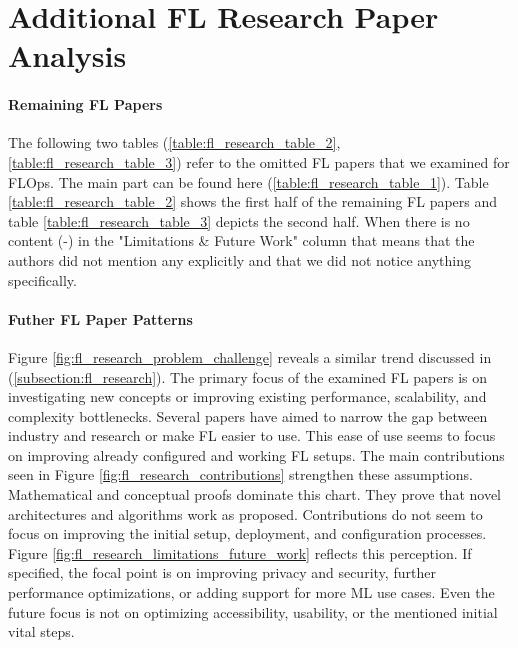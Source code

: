 \appendix
\appendixpage
\addappheadtotoc

\chapter{Additional FL Research Paper Analysis}\label{appendix:fl_research}

\subsubsection{Remaining FL Papers}

The following two tables (\ref{table:fl_research_table_2}, \ref{table:fl_research_table_3}) refer to the omitted FL papers that we examined for FLOps.
The main part can be found here (\ref{table:fl_research_table_1}).
Table \ref{table:fl_research_table_2} shows the first half of the remaining FL papers and
table \ref{table:fl_research_table_3} depicts the second half.
When there is no content (-) in the "Limitations \& Future Work" column that means that the authors did not mention any explicitly and that we did not notice anything specifically.

\begin{figure}[p]
    
\end{figure}

\begin{figure}[p]
    
\end{figure}


\subsubsection{Futher FL Paper Patterns}

Figure \ref{fig:fl_research_problem_challenge} reveals a similar trend discussed in (\ref{subsection:fl_research}).
The primary focus of the examined FL papers is on investigating new concepts or improving existing performance, scalability, and complexity bottlenecks.
Several papers have aimed to narrow the gap between industry and research or make FL easier to use.
This ease of use seems to focus on improving already configured and working FL setups.
The main contributions seen in Figure \ref{fig:fl_research_contributions} strengthen these assumptions.
Mathematical and conceptual proofs dominate this chart.
They prove that novel architectures and algorithms work as proposed.
Contributions do not seem to focus on improving the initial setup, deployment, and configuration processes.
Figure \ref{fig:fl_research_limitations_future_work} reflects this perception.
If specified, the focal point is on improving privacy and security, further performance optimizations, or adding support for more ML use cases.
Even the future focus is not on optimizing accessibility, usability, or the mentioned initial vital steps.

